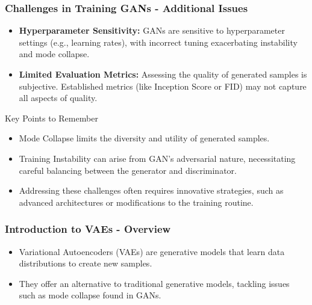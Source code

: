\documentclass[aspectratio=169]{beamer}
\begin{document}
\begin{frame}[fragile]
    \frametitle{Challenges in Training GANs - Additional Issues}
    \begin{itemize}
        \item \textbf{Hyperparameter Sensitivity:} GANs are sensitive to hyperparameter settings (e.g., learning rates), with incorrect tuning exacerbating instability and mode collapse.
        \item \textbf{Limited Evaluation Metrics:} Assessing the quality of generated samples is subjective. Established metrics (like Inception Score or FID) may not capture all aspects of quality.
    \end{itemize}

    \begin{block}{Key Points to Remember}
        \begin{itemize}
            \item Mode Collapse limits the diversity and utility of generated samples.
            \item Training Instability can arise from GAN's adversarial nature, necessitating careful balancing between the generator and discriminator.
            \item Addressing these challenges often requires innovative strategies, such as advanced architectures or modifications to the training routine.
        \end{itemize}
    \end{block}
\end{frame}

\begin{frame}[fragile]
    \frametitle{Introduction to VAEs - Overview}
    \begin{itemize}
        \item Variational Autoencoders (VAEs) are generative models that learn data distributions to create new samples.
        \item They offer an alternative to traditional generative models, tackling issues such as mode collapse found in GANs.
    \end{itemize}
\end{frame}
\end{document}
